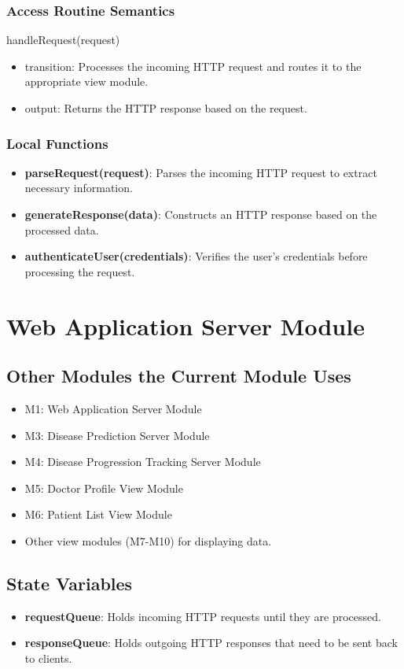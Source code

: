 \documentclass[12pt, titlepage]{article}
\begin{document}
\subsubsection{Access Routine Semantics}

handleRequest(request)
\begin{itemize}
\item transition:  Processes the incoming HTTP request and routes it to the appropriate view module.
\item output: Returns the HTTP response based on the request.
\end{itemize}
\subsubsection{Local Functions}
\begin{itemize}
  \item \textbf{parseRequest(request)}: Parses the incoming HTTP request to extract necessary information.
  \item \textbf{generateResponse(data)}: Constructs an HTTP response based on the processed data.
  \item \textbf{authenticateUser(credentials)}: Verifies the user's credentials before processing the request.
\end{itemize}
\newpage

\newpage

\section{Web Application Server Module}

\subsection{Other Modules the Current Module Uses}
\begin{itemize}
    \item M1: Web Application Server Module
    \item M3: Disease Prediction Server Module
    \item M4: Disease Progression Tracking Server Module
    \item M5: Doctor Profile View Module
    \item M6: Patient List View Module
    \item Other view modules (M7-M10) for displaying data.
\end{itemize}

\subsection{State Variables}
\begin{itemize}
    \item \textbf{requestQueue}: Holds incoming HTTP requests until they are processed.
    \item \textbf{responseQueue}: Holds outgoing HTTP responses that need to be sent back to clients.
\end{itemize}
\end{document}
